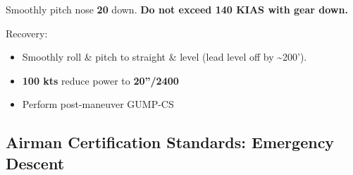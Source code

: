 Smoothly pitch nose \textbf{20\degree{}} down. \textbf{Do not exceed 140 KIAS with gear down.}

Recovery:
\begin{itemize}[label={}]
\item Smoothly roll \& pitch to straight \& level (lead level off by \~{}200’).
\item \textbf{100 kts} reduce power to \textbf{20''/2400}
\item Perform post-maneuver GUMP-CS
\end{itemize}

\newpage
\subsection{Airman Certification Standards: Emergency Descent}

